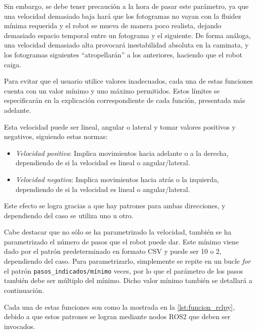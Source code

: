 Sin embargo, se debe tener precaución a la hora de pasar este parámetro, ya que una velocidad demasiado baja hará que los fotogramas no vayan con la fluidez mínima requerida y el robot se mueva de manera poco realista, dejando demasiado espacio temporal entre un fotograma y el siguiente. De forma análoga, una velocidad demasiado alta provocará inestabilidad absoluta en la caminata, y los fotogramas siguientes ``atropellarán'' a los anteriores, haciendo que el robot caiga.

Para evitar que el usuario utilice valores inadecuados, cada una de estas funciones cuenta con un valor mínimo y uno máximo permitidos. Estos límites se especificarán en la explicación correspondiente de cada función, presentada más adelante.

Esta velocidad puede ser lineal, angular o lateral y tomar valores positivos y negativos, siguiendo estas normas:
\begin{itemize}
    \item \textit{Velocidad positiva}: Implica movimientos hacia adelante o a la derecha, dependiendo de si la velocidad es lineal o angular/lateral.
    \item \textit{Velocidad negativa}: Implica movimientos hacia atrás o la izquierda, dependiendo de si la velocidad es lineal o angular/lateral.
\end{itemize}

Este efecto se logra gracias a que hay patrones para ambas direcciones, y dependiendo del caso se utiliza uno u otro.

Cabe destacar que no sólo se ha parametrizado la velocidad, también se ha parametrizado el número de pasos que el robot puede dar. Este mínimo viene dado por el patrón predeterminado en formato CSV y puede ser 10 o 2, dependiendo del caso. Para parametrizarlo, simplemente se repite en un bucle \textit{for} el patrón \texttt{pasos\_indicados/mínimo} veces, por lo que el parámetro de los pasos también debe ser múltiplo del mínimo. Dicho valor mínimo también se detallará a continuación.

Cada una de estas funciones son como la mostrada en la \autoref{lst:funcion_rclpy}, debido a que estos patrones se logran mediante nodos ROS2 que deben ser invocados.

